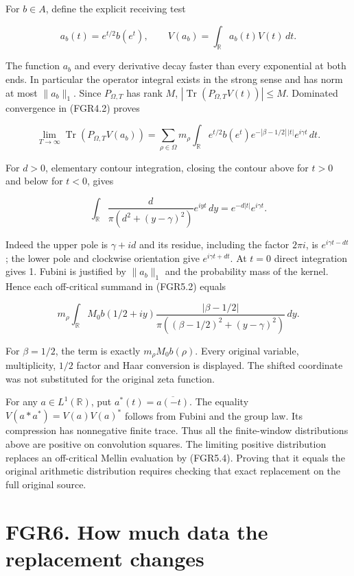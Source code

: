 For \(b\in A\), define the explicit receiving test

\[
 a_b(t)=e^{t/2}b(e^t),\qquad
 V(a_b)=\int_{\mathbb R}a_b(t)V(t)\,dt.
\tag{FGR5.1}
\]

The function \(a_b\) and every derivative decay faster than every
exponential at both ends. In particular the operator integral exists in
the strong sense and has norm at most \(\|a_b\|_1\). Since
\(P_{\Omega,T}\) has rank \(M\),
\(|\operatorname{Tr}(P_{\Omega,T}V(t))|\leq M\). Dominated convergence
in (FGR4.2) proves

\[
 \lim_{T\to\infty}\operatorname{Tr}(P_{\Omega,T}V(a_b))
 =\sum_{\rho\in\Omega}m_\rho
   \int_{\mathbb R}e^{t/2}b(e^t)
              e^{-|\beta-1/2|\,|t|}e^{i\gamma t}\,dt.
\tag{FGR5.2}
\]

For \(d>0\), elementary contour integration, closing the contour above
for \(t>0\) and below for \(t<0\), gives

\[
 \int_{\mathbb R}\frac{d}{\pi(d^2+(y-\gamma)^2)}e^{iyt}\,dy
 =e^{-d|t|}e^{i\gamma t}.
\tag{FGR5.3}
\]

Indeed the upper pole is \(\gamma+id\) and its residue, including the
factor \(2\pi i\), is \(e^{i\gamma t-dt}\); the lower pole and clockwise
orientation give \(e^{i\gamma t+dt}\). At \(t=0\) direct integration
gives 1. Fubini is justified by \(\|a_b\|_1\) and the probability mass
of the kernel. Hence each off-critical summand in (FGR5.2) equals

\[
 m_\rho\int_{\mathbb R} M_0b(1/2+iy)
       \frac{|\beta-1/2|}{\pi((\beta-1/2)^2+(y-\gamma)^2)}\,dy.
\tag{FGR5.4}
\]

For \(\beta=1/2\), the term is exactly \(m_\rho M_0b(\rho)\). Every
original variable, multiplicity, \(1/2\) factor and Haar conversion is
displayed. The shifted coordinate was not substituted for the original
zeta function.

For any \(a\in L^1(\mathbb R)\), put \(a^*(t)=\overline{a(-t)}\). The
equality \(V(a*a^*)=V(a)V(a)^*\) follows from Fubini and the group law.
Its compression has nonnegative finite trace. Thus all the finite-window
distributions above are positive on convolution squares. The limiting
positive distribution replaces an off-critical Mellin evaluation by
(FGR5.4). Proving that it equals the original arithmetic distribution
requires checking that exact replacement on the full original source.

\section{FGR6. How much data the replacement
changes}\label{fgr6.-how-much-data-the-replacement-changes}

